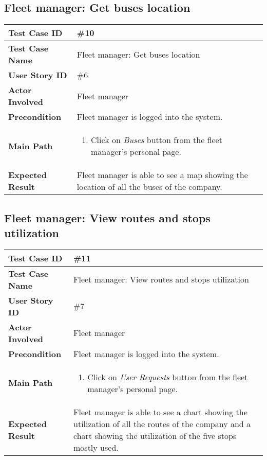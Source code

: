 \subsection{Fleet manager: Get buses location}
\begin{center}
	\begin{tabular} { | m{3.5cm} | m{9.5cm} | }
		\hline
		\textbf{Test Case ID} & \#10\\
		\hline
		\textbf{Test Case Name} & Fleet manager: Get buses location\\
		\hline
		\textbf{User Story ID} & \#6 \\
		\hline
		\textbf{Actor Involved} & Fleet manager\\
		\hline
		\textbf{Precondition} & Fleet manager is logged into the system.\\
		\hline
		\textbf{Main Path} & 
		\begin{enumerate}
			\item Click on \textit{Buses} button from the fleet manager's personal page.
		\end{enumerate}\\
		\hline
		\textbf{Expected Result} & Fleet manager is able to see a map showing the location of all the buses of the company.\\
		\hline
	\end{tabular}
\end{center}

\subsection{Fleet manager: View routes and stops utilization}
\begin{center}
	\begin{tabular} { | m{3.5cm} | m{9.5cm} | }
		\hline
		\textbf{Test Case ID} & \#11\\
		\hline
		\textbf{Test Case Name} & Fleet manager: View routes and stops utilization\\
		\hline
		\textbf{User Story ID} & \#7 \\
		\hline
		\textbf{Actor Involved} & Fleet manager\\
		\hline
		\textbf{Precondition} & Fleet manager is logged into the system.\\
		\hline
		\textbf{Main Path} & 
		\begin{enumerate}
			\item Click on \textit{User Requests} button from the fleet manager's personal page.
		\end{enumerate}\\
		\hline
		\textbf{Expected Result} & Fleet manager is able to see a chart showing the utilization of all the routes of the company and a chart showing the utilization of the five stops mostly used.\\
		\hline
	\end{tabular}
\end{center}
\newpage
